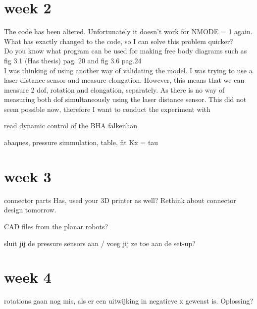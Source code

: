 \section{week 2}


The code has been altered. Unfortunately it doesn't work for NMODE = 1 again. What has exactly changed to the code, so I can solve this problem quicker? \\



Do you know what program can be used for making free body diagrams such as fig 3.1 (Has thesis) pag. 20 and fig 3.6 pag.24\\


I was thinking of using another way of validating the model. I was trying to use a laser distance sensor and measure elongation. However, this means that we can measure 2 dof, rotation and elongation, separately. As there is no way of measuring both dof simultaneously using the laser distance sensor. This did not seem possible now, therefore I want to conduct the experiment with



read dynamic control of the BHA falkenhan



abaques, pressure simmulation, table, fit Kx = tau

\section{week 3}

connector parts Has, used your 3D printer as well? Rethink about connector design tomorrow.

CAD files from the planar robots?

sluit jij de pressure sensors aan / voeg jij ze toe aan de set-up?



\section{week 4}


rotations gaan nog mis, als er een uitwijking in negatieve x gewenst is. Oplossing?

